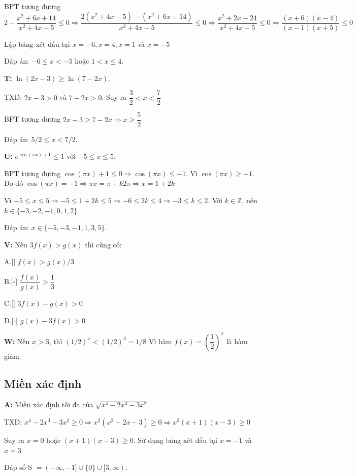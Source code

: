 \documentclass[12pt,a4paper]{article}
\begin{document}
BPT tương đương $2 - \dfrac{x^2+6x+14}{x^2+4x-5} \le 0 \Rightarrow \dfrac{2(x^2+4x-5) - (x^2+6x+14)}{x^2+4x-5} \le 0 \Rightarrow \dfrac{x^2 + 2x - 24}{x^2 + 4x - 5} \le 0 \Rightarrow \dfrac{(x + 6)(x - 4)}{(x - 1)(x + 5)} \le 0$

Lập bảng xét dấu tại $x = -6, x = 4, x = 1$ và $x = -5$

Đáp án: $-6 \le x < -5$ hoặc $1 < x \le 4$.

\textbf{T:} $\ln(2x-3) \ge \ln(7-2x)$. 

TXĐ: $2x - 3 > 0$ và $7 - 2x > 0$. Suy ra $\dfrac{3}{2} < x < \dfrac{7}{2}$

BPT tương đương $2x - 3 \ge 7 - 2x \Rightarrow x \ge \dfrac{5}{2}$

Đáp án: $5/2 \le x < 7/2$.

\textbf{U:} $e^{\cos(\pi x)+1} \le 1$ với $-5 \le x \le 5$.

BPT tương đương $\cos(\pi x)+1 \le 0 \Rightarrow \cos (\pi x) \le -1$. Vì $\cos (\pi x) \ge -1$. Do đó $\cos (\pi x) = - 1 \Rightarrow \pi x = \pi + k2\pi \Rightarrow x = 1 + 2k$

Vì $-5 \le x \le 5 \Rightarrow -5 \le 1 + 2k \le 5 \Rightarrow -6 \le 2k \le 4 \Rightarrow -3 \le k \le 2$. Với $k \in \mathbb{Z}$, nên $k \in \{-3, -2, -1, 0, 1, 2\}$

Đáp án: $x \in \{-5,-3,-1,1,3,5\}$.

\textbf{V:} Nếu $3f(x) > g(x)$ thì cũng có:

A.[\checkmark] $f(x) > g(x)/3$

B.[$\square$] $\dfrac{f(x)}{g(x)} > \dfrac{1}{3}$

C.[\checkmark] $3f(x)-g(x)>0$

D.[$\square$] $g(x) - 3f(x) > 0$

\textbf{W:} Nếu $x > 3$, thì $(1/2)^x < (1/2)^3 = 1/8$ Vì hàm $f(x) = (\dfrac{1}{2})^x$ là hàm giảm.

\subsection{Miền xác định}

\textbf{A:} Miền xác định tối đa của $\sqrt{x^4-2x^3-3x^2}$

TXĐ: $x^4-2x^3-3x^2 \ge 0 \Rightarrow x^2(x^2-2x-3) \ge 0 \Rightarrow x^2(x + 1)(x - 3) \ge 0$

Suy ra $x = 0$ hoặc $(x + 1)(x - 3) \ge 0$. Sử dụng bảng xét dấu tại $x = -1$ và $x = 3$

Đáp số S $ = (-\infty,-1] \cup \{0\} \cup [3,\infty)$.
\end{document}
